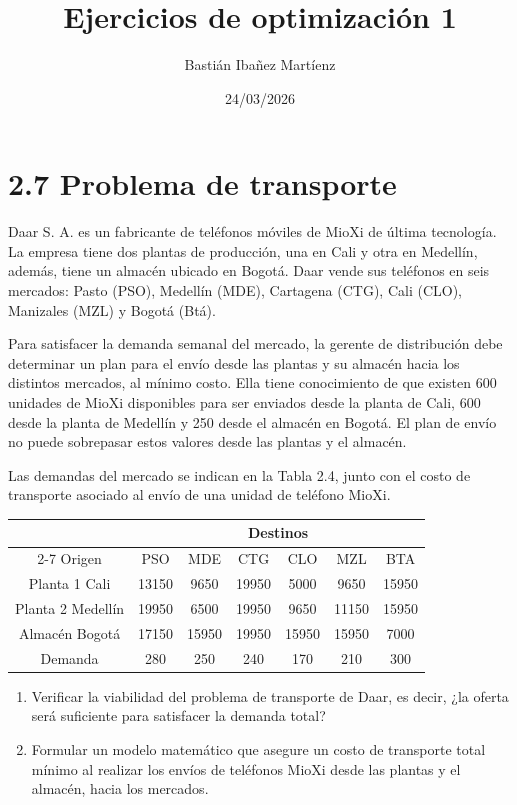 \documentclass{article}
\title{Ejercicios de optimización 1}
\author{Bastián Ibañez Martíenz}
\date{24/03/2026}
\begin{document}
\maketitle
\newpage

\section*{2.7 Problema de transporte}

Daar S. A. es un fabricante de teléfonos móviles de MioXi de última
tecnología. La empresa tiene dos plantas de producción, una en Cali y otra
en Medellín, además, tiene un almacén ubicado en Bogotá. Daar vende
sus teléfonos en seis mercados: Pasto (PSO), Medellín (MDE), Cartagena
(CTG), Cali (CLO), Manizales (MZL) y Bogotá (Btá). \bigskip

Para satisfacer la demanda semanal del mercado, la gerente de distribución
debe determinar un plan para el envío desde las plantas y su almacén
hacia los distintos mercados, al mínimo costo. Ella tiene conocimiento de
que existen 600 unidades de MioXi disponibles para ser enviados desde la
planta de Cali, 600 desde la planta de Medellín y 250 desde el almacén
en Bogotá. El plan de envío no puede sobrepasar estos valores desde las
plantas y el almacén. \bigskip

Las demandas del mercado se indican en la Tabla 2.4, junto con el costo de
transporte asociado al envío de una unidad de teléfono MioXi. \bigskip

\begin{tabular}{|c|cccccc|}
\hline
& \multicolumn{6}{c|}{Destinos} \\
\cline{2-7}
Origen & PSO & MDE & CTG & CLO & MZL & BTA \\
\hline
Planta 1 Cali & 13150 & 9650 & 19950 & 5000 & 9650 & 15950 \\
Planta 2 Medellín & 19950 & 6500 & 19950 & 9650 & 11150 & 15950 \\
Almacén Bogotá & 17150 & 15950 & 19950 & 15950 & 15950 & 7000 \\
\hline
Demanda & 280 & 250 & 240 & 170 & 210 & 300 \\
\hline
\end{tabular} \bigskip

\begin{enumerate}[label=\alph*.]
    \item Verificar la viabilidad del problema de transporte de Daar, es decir,
¿la oferta será suficiente para satisfacer la demanda total?
    \item Formular un modelo matemático que asegure un costo de transporte
total mínimo al realizar los envíos de teléfonos MioXi desde las
plantas y el almacén, hacia los mercados.
\end{enumerate}
\end{document}
